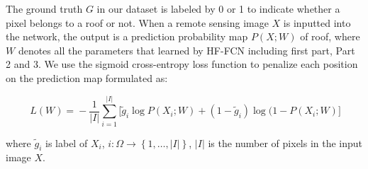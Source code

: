 The ground truth $G$ in our dataset is labeled by 0 or 1 to indicate whether a pixel belongs to a roof or not. 
When a remote sensing image ${X}$ is inputted into the network, the output is a prediction probability map $P(X;W)$ of roof, where $W$ denotes all the parameters that learned by HF-FCN including first part, Part 2 and 3.
We use the sigmoid cross-entropy loss function to penalize each position on the prediction map formulated as:
\begin{small}
\begin{equation}
     \label{loss}
     \ L(W)\! =\! -\frac{1}{\vert I\vert}\sum_{i=1}^{\vert I \vert}\lbrack{\tilde{g}_i \log{P(X_{i};W)}\!+\!(1\!-\!\tilde{g}_i)\log(1\!-\!P(X_{i};W)}\rbrack
\end{equation}
\end{small}
where $\tilde{g}_i$ is label of $X_{i}$, ${i:\Omega \to\left\{1,\ldots,\vert I\vert\right\}}$, ${\vert I\vert}$ is the number of pixels in the input image ${X}$.
